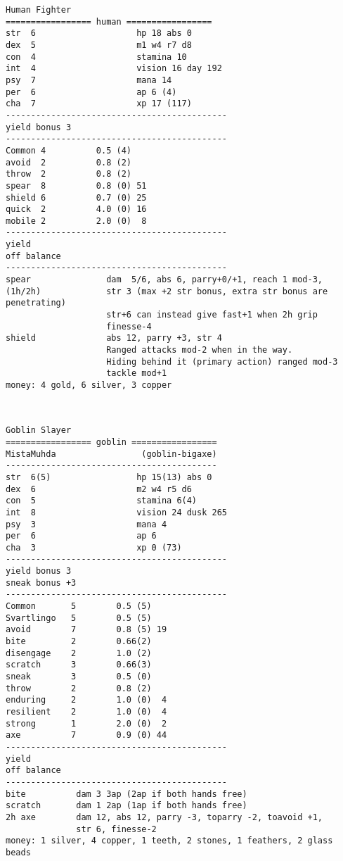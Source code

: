 \pagebreak[3]
\tiny \begin{samepage} \begin{verbatim}
Human Fighter
================= human =================
str  6                    hp 18 abs 0
dex  5                    m1 w4 r7 d8
con  4                    stamina 10
int  4                    vision 16 day 192
psy  7                    mana 14
per  6                    ap 6 (4)
cha  7                    xp 17 (117)
--------------------------------------------
yield bonus 3
--------------------------------------------
Common 4          0.5 (4)
avoid  2          0.8 (2)
throw  2          0.8 (2)
spear  8          0.8 (0) 51
shield 6          0.7 (0) 25
quick  2          4.0 (0) 16
mobile 2          2.0 (0)  8
--------------------------------------------
yield
off balance
--------------------------------------------
spear               dam  5/6, abs 6, parry+0/+1, reach 1 mod-3,
(1h/2h)             str 3 (max +2 str bonus, extra str bonus are penetrating)
                    str+6 can instead give fast+1 when 2h grip
                    finesse-4
shield              abs 12, parry +3, str 4
                    Ranged attacks mod-2 when in the way.
                    Hiding behind it (primary action) ranged mod-3
                    tackle mod+1
money: 4 gold, 6 silver, 3 copper
\end{verbatim} \end{samepage} \normalsize


\


\pagebreak[3]
\tiny \begin{samepage} \begin{verbatim}
Goblin Slayer
================= goblin =================
MistaMuhda                 (goblin-bigaxe)
------------------------------------------
str  6(5)                 hp 15(13) abs 0
dex  6                    m2 w4 r5 d6
con  5                    stamina 6(4)
int  8                    vision 24 dusk 265
psy  3                    mana 4
per  6                    ap 6
cha  3                    xp 0 (73)
--------------------------------------------
yield bonus 3
sneak bonus +3
--------------------------------------------
Common       5        0.5 (5)
Svartlingo   5        0.5 (5)
avoid        7        0.8 (5) 19
bite         2        0.66(2)
disengage    2        1.0 (2)
scratch      3        0.66(3)
sneak        3        0.5 (0)
throw        2        0.8 (2)
enduring     2        1.0 (0)  4
resilient    2        1.0 (0)  4
strong       1        2.0 (0)  2
axe          7        0.9 (0) 44
--------------------------------------------
yield
off balance
--------------------------------------------
bite          dam 3 3ap (2ap if both hands free)
scratch       dam 1 2ap (1ap if both hands free)
2h axe        dam 12, abs 12, parry -3, toparry -2, toavoid +1,
              str 6, finesse-2
money: 1 silver, 4 copper, 1 teeth, 2 stones, 1 feathers, 2 glass beads
\end{verbatim} \end{samepage} \normalsize


